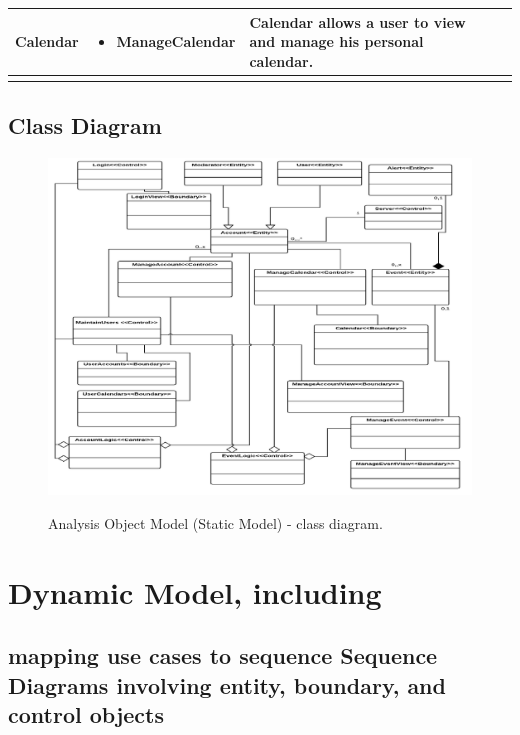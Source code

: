 \documentclass{article}
\begin{document}
\begin{tabular}{l c l @{} l}
\textbf{Calendar}&\parbox{.45\textwidth}{
            \begin{itemize}
                \item ManageCalendar
            \end{itemize} }
&\parbox{.3\textwidth}{
          Calendar allows a user to view and manage his personal calendar.  } \\
	\hline
		\pagebreak{}

\end{tabular}

		
		\pagebreak{}

\subsection{Class Diagram}
\begin{figure}[!htb]
                \caption{Analysis Object Model (Static Model) - class diagram.}
		\includegraphics[scale = 0.6]{AnalysisObjectModel.png}\\
		\pagebreak{}
	\end{figure}


		\clearpage

\section{Dynamic Model, including}
\subsection{mapping use cases to sequence Sequence Diagrams involving entity, boundary, and control objects}
\end{document}
